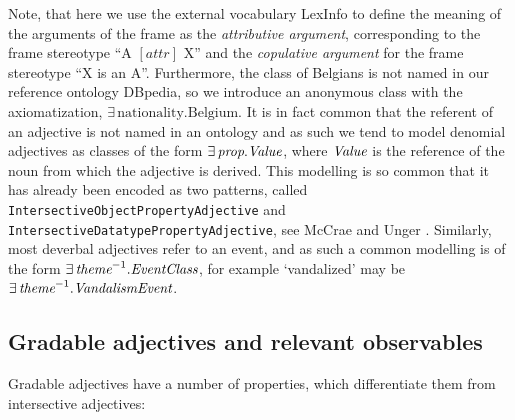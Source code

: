\documentclass[11pt]{article}
\begin{document}
Note, that here we use the external vocabulary LexInfo \cite{cimiano2011lexinfo} 
to define the meaning of the arguments of the frame as the \emph{attributive 
argument}, corresponding to the frame stereotype ``A $[attr]$ X'' and the 
\emph{copulative argument} for the frame stereotype ``X is an A''. Furthermore,
the class of Belgians is not named in our reference ontology DBpedia, so we 
introduce an anonymous class with the axiomatization, 
$\exists\,\text{nationality}.\text{Belgium}$. It is in fact common that the 
referent of an adjective is not named in an ontology and as such we tend to 
model denomial adjectives as classes of the form $\exists\,\text{\em prop}.\text{\em Value}$, 
where $\text{\em Value}$ is the reference of the noun from which the adjective is
derived. This modelling is so common that it has already been encoded as two
patterns, called {\tt IntersectiveObjectPropertyAdjective} and {\tt
IntersectiveDatatypePropertyAdjective}, see McCrae and Unger .
Similarly, most deverbal adjectives refer to an event, and as such
a common modelling is of the form $\exists\,\text{\em theme}^{-1}.\text{\em EventClass}$, 
for example `vandalized' may be $\exists\,\text{\em theme}^{-1}.\text{\em VandalismEvent}$.

\subsection{Gradable adjectives and relevant observables} \label{sec:gradables}

Gradable adjectives have a number of properties, which differentiate them
from intersective adjectives:
\end{document}

